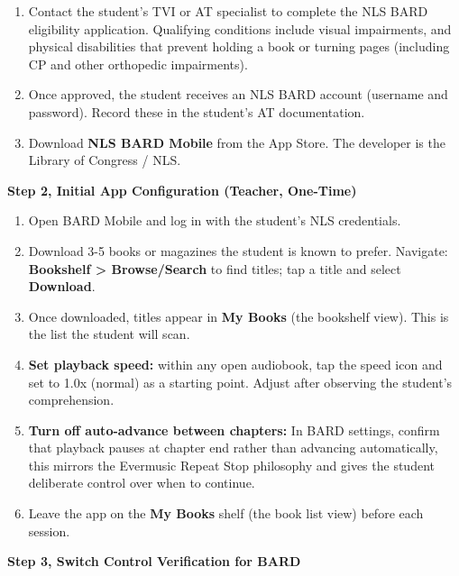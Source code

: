 \documentclass[justified,openright]{tufte-book}
\begin{document}
\begin{enumerate}
\item
  Contact the student's TVI or AT specialist to complete the NLS BARD
  eligibility application. Qualifying conditions include visual
  impairments, and physical disabilities that prevent holding a book or
  turning pages (including CP and other orthopedic impairments).
\item
  Once approved, the student receives an NLS BARD account (username and
  password). Record these in the student's AT documentation.
\item
  Download \textbf{NLS BARD Mobile} from the App Store. The developer
  is the Library of Congress / NLS.
\end{enumerate}

\textbf{Step 2, Initial App Configuration (Teacher, One-Time)}

\begin{enumerate}
\item
  Open BARD Mobile and log in with the student's NLS credentials.
\item
  Download 3-5 books or magazines the student is known to prefer.
  Navigate: \textbf{Bookshelf \textgreater{} Browse/Search} to find
  titles; tap a title and select \textbf{Download}.
\item
  Once downloaded, titles appear in \textbf{My Books} (the bookshelf
  view). This is the list the student will scan.
\item
  \textbf{Set playback speed:} within any open audiobook, tap the
  speed icon and set to 1.0x (normal) as a starting point. Adjust
  after observing the student's comprehension.
\item
  \textbf{Turn off auto-advance between chapters:} In BARD settings,
  confirm that playback pauses at chapter end rather than advancing
  automatically, this mirrors the Evermusic Repeat Stop philosophy
  and gives the student deliberate control over when to continue.
\item
  Leave the app on the \textbf{My Books} shelf (the book list view)
  before each session.
\end{enumerate}


\textbf{Step 3, Switch Control Verification for BARD}
\end{document}
